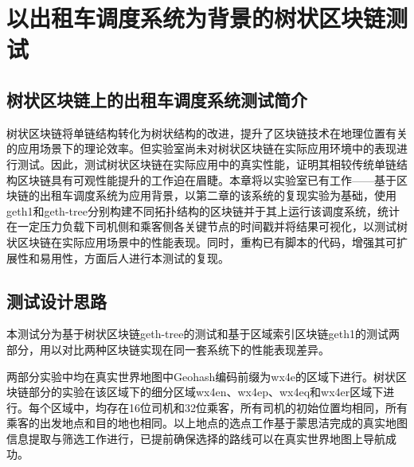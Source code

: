 %
%
%
%
%

\chapter{以出租车调度系统为背景的树状区块链测试}

\section{树状区块链上的出租车调度系统测试简介}

树状区块链将单链结构转化为树状结构的改进，提升了区块链技术在地理位置有关的应用场景下的理论效率。但实验室尚未对树状区块链在实际应用环境中的表现进行测试。因此，测试树状区块链在实际应用中的真实性能，证明其相较传统单链结构区块链具有可观性能提升的工作迫在眉睫。本章将以实验室已有工作——基于区块链的出租车调度系统为应用背景，以第二章的该系统的复现实验为基础，使用geth1和geth-tree分别构建不同拓扑结构的区块链并于其上运行该调度系统，统计在一定压力负载下司机侧和乘客侧各关键节点的时间戳并将结果可视化，以测试树状区块链在实际应用场景中的性能表现。同时，重构已有脚本的代码，增强其可扩展性和易用性，方面后人进行本测试的复现。

\section{测试设计思路}

本测试分为基于树状区块链geth-tree的测试和基于区域索引区块链geth1的测试两部分，用以对比两种区块链实现在同一套系统下的性能表现差异。

两部分实验中均在真实世界地图中Geohash编码前缀为wx4e的区域下进行。树状区块链部分的实验在该区域下的细分区域wx4en、wx4ep、wx4eq和wx4er区域下进行。每个区域中，均存在16位司机和32位乘客，所有司机的初始位置均相同，所有乘客的出发地点和目的地也相同。以上地点的选点工作基于蒙思洁完成的真实地图信息提取与筛选工作进行，已提前确保选择的路线可以在真实世界地图上导航成功。

